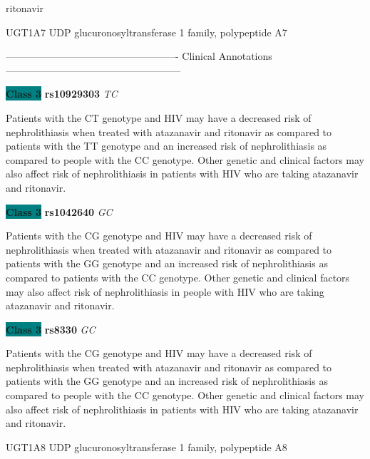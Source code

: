 \documentclass{resume} %
\begin{document}
\begin{rSection}{ ritonavir }
\begin{rSubsection}{ UGT1A7 }{ UDP glucuronosyltransferase 1 family, polypeptide A7 }{}{}
\item[] ---------------------------------------------------- Clinical Annotations -----------------------------------------------------\newline
\item \textbf{\colorbox{teal} {Class 3}} \textbf{ rs10929303 } \textit{ TC }
\item[] Patients with the CT genotype and HIV may have a decreased risk of nephrolithiasis when treated with atazanavir and ritonavir as compared to patients with the TT genotype and an increased risk of nephrolithiasis as compared to people with the CC genotype. Other genetic and clinical factors may also affect risk of nephrolithiasis in patients with HIV who are taking atazanavir and ritonavir. \item \textbf{\colorbox{teal} {Class 3}} \textbf{ rs1042640 } \textit{ GC }
\item[] Patients with the CG genotype and HIV may have a decreased risk of nephrolithiasis when treated with atazanavir and ritonavir as compared to patients with the GG genotype and an increased risk of nephrolithiasis as compared to patients with the CC genotype. Other genetic and clinical factors may also affect risk of nephrolithiasis in people with HIV who are taking atazanavir and ritonavir.\item \textbf{\colorbox{teal} {Class 3}} \textbf{ rs8330 } \textit{ GC }
\item[] Patients with the CG genotype and HIV may have a decreased risk of nephrolithiasis when treated with atazanavir and ritonavir as compared to patients with the GG genotype and an increased risk of nephrolithiasis as compared to people with the CC genotype. Other genetic and clinical factors may also affect risk of nephrolithiasis in patients with HIV who are taking atazanavir and ritonavir.
\end{rSubsection}\begin{rSubsection}{ UGT1A8 }{ UDP glucuronosyltransferase 1 family, polypeptide A8 }{}{}
\item[]


\end{rSubsection}
\end{rSection}
\end{document}

